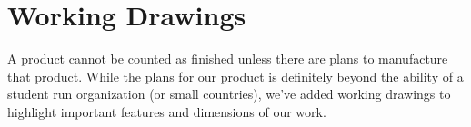 


\section{Working Drawings}
A product cannot be counted as finished unless there are plans to manufacture that product. While the plans for our product is definitely beyond the ability of a student run organization (or small countries), 
we've added working drawings to highlight important features and dimensions of our work.

\newcommand{\WorkingDrawing}[1]{
 \subsection{#1}
 
 }
